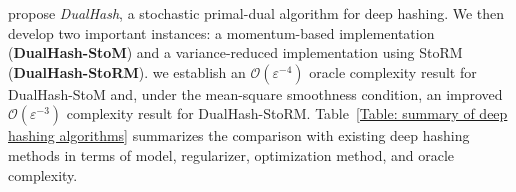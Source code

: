   propose \textit{DualHash}, a stochastic primal-dual algorithm for deep hashing. We then develop two important instances: a momentum-based implementation (\textbf{DualHash-StoM}) and a variance-reduced implementation using StoRM (\textbf{DualHash-StoRM}).  we establish an $\mathcal{O}(\varepsilon^{-4})$ oracle complexity result for DualHash-StoM and, under the mean-square smoothness condition, an improved $\mathcal{O}(\varepsilon^{-3})$ complexity result for DualHash-StoRM. Table~\ref{Table: summary of deep hashing algorithms} summarizes the comparison with existing deep hashing methods in terms of model, regularizer, optimization method, and oracle complexity. 
